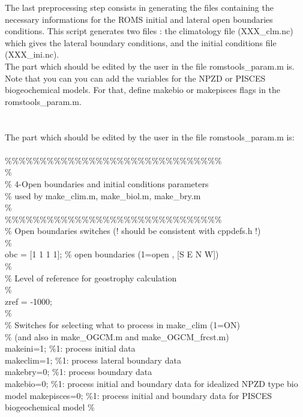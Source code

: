 The last preprocessing step consists in generating the files containing 
the necessary informations for the ROMS initial and lateral open boundaries 
conditions.
This script generates two files : the climatology file (XXX\_clm.nc) which gives 
the lateral boundary conditions, and the initial conditions file (XXX\_ini.nc). \\
The part which should be edited by the user in the file romstools\_param.m is. Note that you can 
you can add the variables for the NPZD or PISCES biogeochemical models. For that, 
define makebio or makepisces flags in the romstools\_param.m. \\
\\ \\
The part which should be edited by the user in the file romstools\_param.m is:
\\ \\
\%\%\%\%\%\%\%\%\%\%\%\%\%\%\%\%\%\%\%\%\%\%\%\%\%\%\%\%\%\%\%\\
\%\\
\% 4-Open boundaries and initial conditions parameters\\
\%   used by make\_clim.m, make\_biol.m, make\_bry.m\\
\%\\
\%\%\%\%\%\%\%\%\%\%\%\%\%\%\%\%\%\%\%\%\%\%\%\%\%\%\%\%\%\%\%\\
\%  Open boundaries switches (! should be consistent with cppdefs.h !)\\
\%\\
obc = [1 1 1 1]; \% open boundaries (1=open , [S E N W])\\
\%\\
\%  Level of reference for geostrophy calculation\\
\%\\
zref = -1000;\\
\%\\
\%  Switches for selecting what to process in make\_clim (1=ON)\\
\%  (and also in make\_OGCM.m and make\_OGCM\_frcst.m)\\
makeini=1;      \%1: process initial data\\
makeclim=1;     \%1: process lateral boundary data\\
makebry=0;      \%1: process boundary data\\
makebio=0;      \%1: process initial and boundary data for idealized NPZD type bio model
makepisces=0;  \%1: process initial and boundary data for PISCES biogeochemical model
\%\\

